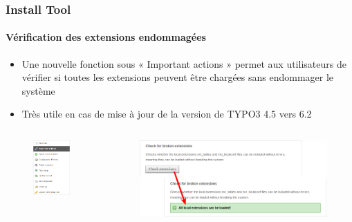 \begin{frame}[fragile]
	\frametitle{Install Tool}
	\framesubtitle{Vérification des extensions endommagées}

	\begin{itemize}
		\item Une nouvelle fonction sous « Important actions » permet aux utilisateurs de vérifier si toutes les extensions peuvent être chargées sans endommager le système
		\item Très utile en cas de mise à jour de la version de TYPO3 4.5 vers 6.2
	\end{itemize}

	\begin{columns}[T]
		\begin{column}{.3\textwidth}
			\begin{figure}\vspace*{-0.4cm}
				\includegraphics[width=0.7\linewidth]{Images/InstallTool/ImportantActions.png}
			\end{figure}
		\end{column}
		\begin{column}{.7\textwidth}
			\begin{figure}\vspace*{-0.4cm}
				\includegraphics[width=1\linewidth]{Images/InstallTool/CheckForBrokenExtensions.png}

\end{figure}
\end{column}
\end{columns}
\end{frame}
